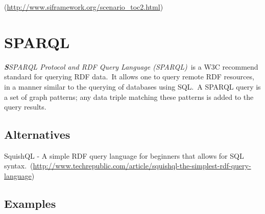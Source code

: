 \documentclass[DIV=calc, paper=a4, fontsize=12pt, onecolumn]{scrartcl}	 %
\newcommand{\initial}[1]{ %
\lettrine[lines=3,lhang=0.3,nindent=0em,slope=0em]{
\color{DarkBlue}
{\textbf{\textit{#1}}}}{}}
\begin{document}
  (\url{http://www.siframework.org/scenario_toc2.html})\


  \section[SPARQL Protocol and RDF Query Language (SPARQL)]{SPARQL}
  \label{sec:sparql}

  \initial{S}\textit{SPARQL Protocol and RDF Query Language (SPARQL)}\
  is a W3C recommend standard for querying RDF data.\
  It allows one to query remote RDF resources, in a manner similar to the querying of databases using SQL.\
  A SPARQL query is a set of graph patterns; any data triple matching these patterns is added to the query results.\
  \citep{Jarrar_mashql:_2008}\\     
		
  \subsection{Alternatives}

  SquishQL - A simple RDF query language for beginners that allows for SQL syntax.\
  \noindent(\url{http://www.techrepublic.com/article/squishql-the-simplest-rdf-query-language})\\

  \subsection{Examples}
\end{document}
